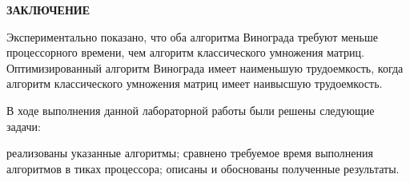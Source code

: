 \begin{center}
    \textbf{ЗАКЛЮЧЕНИЕ}
\end{center}

Экспериментально показано, что оба алгоритма Винограда требуют меньше процессорного времени,
чем алгоритм классического умножения матриц. Оптимизированный алгоритм Винограда имеет
наименьшую трудоемкость, когда алгоритм классического умножения матриц имеет наивысшую
трудоемкость.

В ходе выполнения данной лабораторной работы были решены следующие задачи:
\begin{itemize}
	\itemm реализованы указанные алгоритмы;
        \itemm сравнено требуемое время выполнения алгоритмов в тиках процессора;
        \itemm описаны и обоснованы полученные результаты.
\end{itemize}
